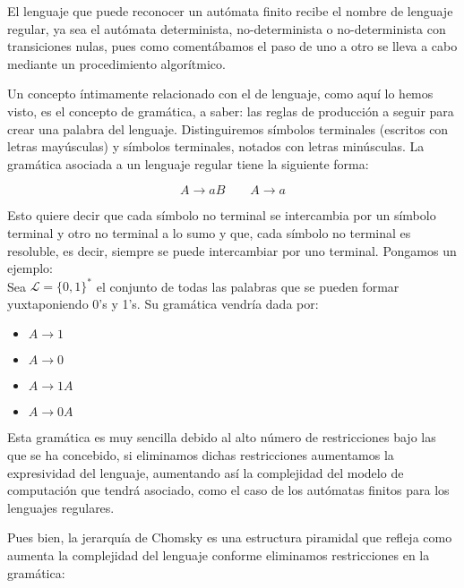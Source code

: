 El lenguaje que puede reconocer un autómata finito recibe el nombre de lenguaje regular, ya sea el autómata determinista, no-determinista o no-determinista con transiciones nulas, pues como comentábamos el paso de uno a otro se lleva a cabo mediante un procedimiento algorítmico. 

Un concepto íntimamente relacionado con el de lenguaje, como aquí lo hemos visto, es el concepto de gramática, a saber: las reglas de producción a seguir para crear una palabra del lenguaje. Distinguiremos símbolos terminales (escritos con letras mayúsculas) y símbolos terminales, notados con letras minúsculas. La gramática asociada a un lenguaje regular tiene la siguiente forma:


$$ A \rightarrow a B \quad \quad A \rightarrow a$$ 

Esto quiere decir que cada símbolo no terminal se intercambia por un símbolo terminal y otro no terminal a lo sumo y que, cada símbolo no terminal es resoluble, es decir, siempre se puede intercambiar por uno terminal. Pongamos un ejemplo: \\

Sea $\mathcal{L}=\{0,1\}^*$ el conjunto de todas las palabras que se pueden formar yuxtaponiendo 0's y 1's. Su gramática vendría dada por:


\begin{multicols}{2}
	\begin{itemize}
		\item $A \rightarrow 1$
		\item $A \rightarrow 0$
		\item $A \rightarrow 1A$
		\item $A \rightarrow 0A$  
	\end{itemize}
\end{multicols}


Esta gramática es muy sencilla debido al alto número de restricciones bajo las que se ha concebido, si eliminamos dichas restricciones aumentamos la expresividad del lenguaje, aumentando así la complejidad del modelo de computación que tendrá asociado, como el caso de los autómatas finitos para los lenguajes regulares.


Pues bien, la jerarquía de Chomsky es una estructura piramidal que refleja como aumenta la complejidad del lenguaje conforme eliminamos restricciones en la gramática:

\vspace{1cm}


